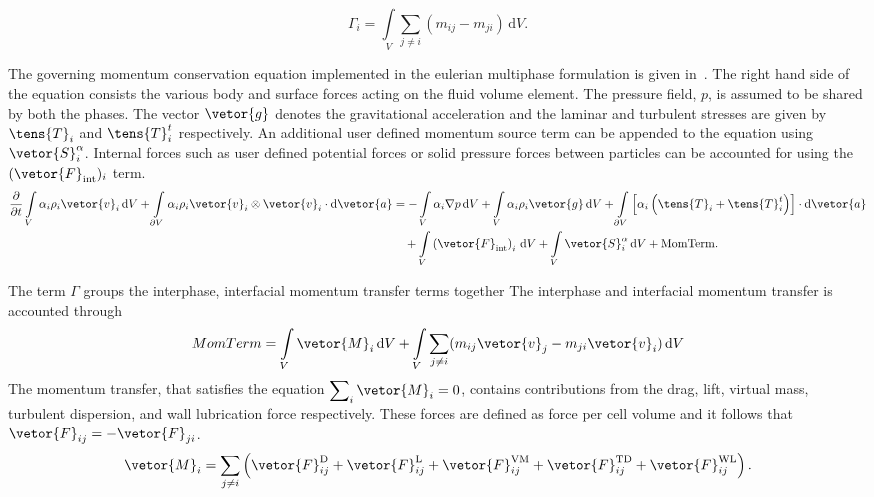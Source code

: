 \begin{equation}
    \Gamma_{i} = \int\limits_{V} \sum_{j \neq i} (m_{ij} - m_{ji})\,\mathrm{d}V .
\end{equation}
 

The governing momentum conservation equation implemented in the eulerian 
 multiphase formulation is given in~. 
 The right hand side of the equation consists the various body and surface forces acting on the 
 fluid volume element. The pressure field, $p$, is assumed to be
 shared by both the phases. The vector $\vetor{g}$ denotes the gravitational acceleration and
 the laminar and turbulent stresses are given by $\tens{T}_{i}$ and $\tens{T}^{t}_{i}$ respectively.
 An additional user defined momentum source term can be appended to the equation using
 $\vetor{S}^{\alpha}_{i}$. Internal forces such as user defined potential forces or 
 solid pressure forces between particles can be accounted for using the $(\vetor{F}_{\text{int}})_{i}$ term.
\begin{equation}\label{eq:emp-mom-conserv}
\begin{split}
\frac{\partial}{\partial t}
\int\limits_{V} \alpha_{i} \rho_{i} \vetor{v}_{i} \,\mathrm{d}V
+ \int\limits_{\partial V} \alpha_{i} \rho_{i} \vetor{v}_{i} \otimes \vetor{v}_{i} \cdot \mathrm{d}\vetor{a}
&= -\int\limits_{V} \alpha_{i} \nabla p \,\mathrm{d}V
+ \int\limits_{V} \alpha_{i} \rho_{i} \vetor{g} \,\mathrm{d}V 
+ \int\limits_{\partial V} \left[ \alpha_{i} \left( \tens{T}_{i} + \tens{T}^{t}_{i} \right) \right] \cdot \mathrm{d}\vetor{a} \\
&\quad {} + \int\limits_{V} \left( \vetor{F}_{\text{int}} \right)_{i} \,\mathrm{d}V
+ \int\limits_{V} \vetor{S}^{\alpha}_{i} \,\mathrm{d}V
+ \mathrm{MomTerm}.
\end{split}
\end{equation}

The term $\Gamma$ groups the interphase, interfacial momentum transfer
 terms together
The interphase and interfacial momentum transfer is accounted through
\begin{equation}
    MomTerm =  \int\limits_{V} \vetor{M}_{i}\,\mathrm{d}V 
    + \int\limits_{V} \sum_{j \neq i} (m_{ij}\vetor{v}_{j} - m_{ji}\vetor{v}_{i})\,\mathrm{d}V
\end{equation}
The momentum transfer, that satisfies the equation $\displaystyle \sum\nolimits_{i}\vetor{M}_{i} = 0$,
 contains contributions from the drag, lift, virtual mass, turbulent dispersion, and wall lubrication force
 respectively. These forces are defined as force per cell volume and it follows that
 $\vetor{F}_{ij} = -\vetor{F}_{ji}$.
 \begin{equation}
    \vetor{M}_{i} = \sum_{j \neq i} \left(\vetor{F}_{ij}^{\mathrm{D}}
    + \vetor{F}_{ij}^{\mathrm{L}} + \vetor{F}_{ij}^{\mathrm{VM}} 
   + \vetor{F}_{ij}^{\mathrm{TD}} + \vetor{F}_{ij}^{\mathrm{WL}}\right).
 \end{equation}

